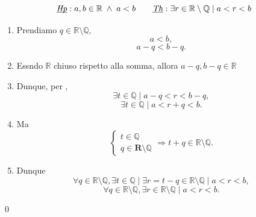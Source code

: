 \[ \underbar{\textit{Hp}}: a,b \in\mathbb{R} \;\land\;  a < b \qquad \underbar{\textit{Th}}: \exists r\in\mathbb{R}\setminus\mathbb{Q} \mid a<r<b \]

\begin{enumerate}[label=(\roman*)]
    \item Prendiamo $q \in\mathbb{R}\setminus\mathbb{Q},$
        \[ a < b ,\]\[ a - q < b - q .\]
    \item Essndo $\mathbb{R}$ chiuso rispetto alla somma, allora $a-q, b-q \in\mathbb{R}$
    \item Dunque, per ,
        \[ \exists t\in\mathbb{Q} \mid a-q<r<b-q, \]
        \[ \exists t\in\mathbb{Q} \mid a <r + q< b. \]
    \item Ma
        \[
            \begin{cases}
                t \in\mathbb{Q}\\
                q \in\mathbf{R}\setminus\mathbb{Q}
            \end{cases} \Rightarrow
            t+q\in\mathbb{R}\setminus\mathbb{Q}.
        \]
    \item Dunque
        \[
            \forall q \in\mathbb{R}\setminus\mathbb{Q}, \exists t\in\mathbb{Q}\mid
            \exists r = t-q \in\mathbb{R}\setminus\mathbb{Q} \mid a < r< b,  
        \]
        \[
            \forall q \in\mathbb{R}\setminus\mathbb{Q},
            \exists r \in\mathbb{R}\setminus\mathbb{Q} \mid a < r< b .
        \]
\end{enumerate}
\qed